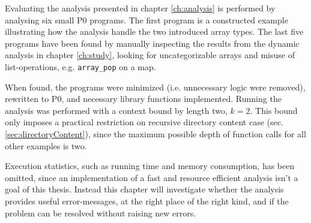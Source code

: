 Evaluating the analysis presented in chapter \ref{ch:analysis} is performed by analysing six small P0 programs. The first program is a constructed example illustrating how the analysis handle the two introduced array types. The last five programs have been found by manually inspecting the results from the dynamic analysis in chapter \ref{ch:study}, looking for uncategorizable arrays and misuse of list-operations, e.g. \texttt{array\_pop} on a map. 


When found, the programs were minimized (i.e. unnecessary logic were removed), rewritten to P0, and necessary library functions implemented. Running the analysis was performed with a context bound by length two, $k=2$. This bound only imposes a practical restriction on recursive directory content case (sec. \ref{sec:directoryContent}), since the maximum possible depth of function calls for all other examples is two. 

Execution statistics, such as running time and memory consumption, has been omitted, since an implementation of a fast and resource efficient analysis isn't a goal of this thesis. Instead this chapter will investigate whether the analysis provides useful error-messages, at the right place of the right kind, and if the problem can be resolved without raising new errors.



